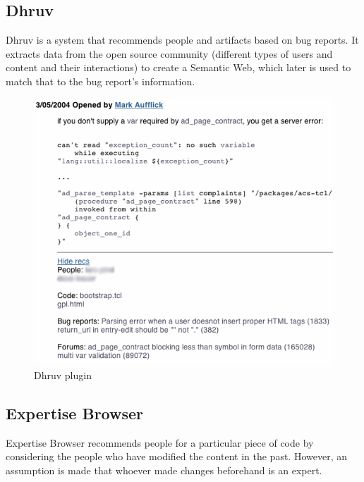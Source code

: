 \documentclass{l4proj}
\begin{document}
\subsection{Dhruv}
Dhruv \cite{dhruv} is a system that recommends people and artifacts based on bug reports. It extracts data from the open source community (different types of users and content and their interactions) to create a Semantic Web, which later is used to match that to the bug report's information.

\begin{figure}[H]
\includegraphics[scale=0.45]{dhruv}
\centering
\caption{Dhruv plugin}\label{dhruv}
\label{fig:dhruv}
\end{figure}

\subsection{Expertise Browser}
Expertise Browser \cite{expertisebrowser} recommends people for a particular piece of code by considering the people who have modified the content in the past. However, an assumption is made that whoever made changes beforehand is an expert.
\end{document}
